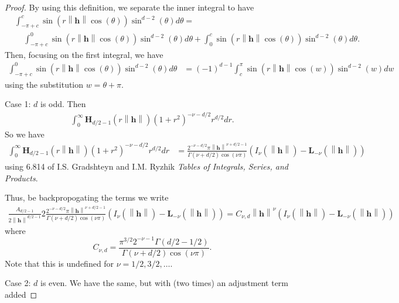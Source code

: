 \documentclass[11pt]{article}
\newcommand{\hh}{\left\lVert \boldsymbol{h}\right\rVert}
\begin{document}
\begin{proof}
By using this definition, we separate the inner integral to have \begin{align*}
&\int_{-\pi+c}^c \sin(r\hh\cos(\theta))\sin^{d-2}(\theta) d\theta = \\
&\ \ \ \ \ \int_{-\pi+c}^0 \sin(r\hh\cos(\theta))\sin^{d-2}(\theta) d\theta + \int_{0}^c \sin(r\hh\cos(\theta))\sin^{d-2}(\theta) d\theta.
\end{align*}Then, focusing on the first integral, we have \begin{align*}
\int_{-\pi+c}^0 \sin(r\hh\cos(\theta))\sin^{d-2}(\theta) d\theta &= (-1)^{d-1}\int_c^\pi \sin(r\hh\cos(w))\sin^{d-2}(w) dw
\end{align*}using the substitution $ w = \theta+\pi$.

Case 1: $d$ is odd. Then  \begin{align}
\int_0^\infty \boldsymbol{H}_{d/2 - 1}(r\hh) (1+ r^2)^{-\nu-d/2} r^{d/2}dr.
\end{align}
So we have \begin{align*}
\int_0^\infty \boldsymbol{H}_{d/2 - 1}(r\hh) (1+ r^2)^{-\nu-d/2} r^{d/2}dr &= \frac{2^{-\nu - d/2}\pi \hh^{\nu+d/2-1}}{\Gamma(\nu + d/2)\cos(\nu\pi)}\left(I_{\nu}(\hh) - \boldsymbol{L}_{-\nu}(\hh)\right)
\end{align*}using 6.814 of I.S. Gradshteyn and I.M. Ryzhik \textit{Tables of Integrals, Series, and Products}. 

Thus, be backpropogating the terms we write \begin{align*}
\frac{A_{d/2-1}}{2\hh^{d/2-1}}2\frac{2^{-\nu - d/2}\pi \hh^{\nu+d/2-1}}{\Gamma(\nu + d/2)\cos(\nu\pi)}\left(I_{\nu}(\hh) - \boldsymbol{L}_{-\nu}(\hh)\right)=C_{\nu,d}\hh^{\nu}\left(I_{\nu}(\hh) - \boldsymbol{L}_{-\nu}(\hh)\right)
\end{align*}where $$C_{\nu,d} = \frac{\pi^{3/2}2^{-\nu - 1}\Gamma(d/2 - 1/2)}{\Gamma(\nu + d/2) \cos(\nu\pi)}.$$Note that this is undefined for $\nu = 1/2, 3/2, \dots$.%



Case 2: $d$ is even. We have the same, but with (two times) an adjustment term added



\end{proof}
\end{document}
